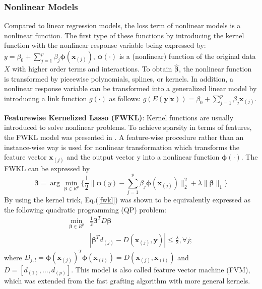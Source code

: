 \documentclass[lang=cn,10pt]{gorgeousnbook}
\numberwithin{equation}{section}%
\numberwithin{figure}{section}%
\begin{document}
\subsubsection{Nonlinear Models}
Compared to linear regression models, the loss term of nonlinear models is a nonlinear function. The first type of these
functions by introducing the kernel function with the nonlinear response variable being expressed by: $y=\beta_0+\sum_{j=1}^p\beta_j\pmb\phi(\textbf{x}_{(j)})$, $\pmb\phi(\cdot)$ is a (nonlinear) function of the original data $X$ with higher order terms and interactions. To obtain $\hat{\boldsymbol{\beta}}$, the nonlinear function is transformed by
piecewise polynomials, splines, or kernels. In addition, a nonlinear response variable can be transformed into a generalized
linear model by introducing a link function $g(\cdot)$ as follows: $g(E(\mathbf{y}|\mathbf{x}))=\beta_{0}+\sum_{j=1}^{p}\beta_{j}\mathbf{x}_{(j)}$.

\textbf{Featurewise Kernelized Lasso (FWKL)}: Kernel functions are usually introduced to solve nonlinear problems.
To achieve sparsity in terms of features, the FWKL model was presented in \cite{ref3}. A feature-wise procedure rather than an instance-wise way is used for nonlinear transformation which transforms the feature vector $\mathbf{x}_{(j)}$ and the output vector y into a nonlinear function $\pmb\phi(\cdot)$. The FWKL can be expressed by 
\begin{equation}
\boldsymbol{\beta}=\operatorname{arg}\operatorname*{min}_{\boldsymbol{\beta}\in R^{p}}\{\frac{1}{2}\|\boldsymbol{\phi}(y)-\sum_{j=1}^{p}\beta_{j}\boldsymbol{\phi}(\boldsymbol{x}_{(j)})\|_{2}^{2}+\lambda\|\boldsymbol{\beta}\|_1\}
\label{fwkl}
\end{equation}
By using the kernel trick, Eq.(\ref{fwkl}) was shown to be equivalently expressed as the following quadratic programming (QP) problem:
\begin{equation}
\begin{aligned}
\operatorname*{min}_{\boldsymbol\beta\in R^{p}}&\frac{1}{2}\boldsymbol\beta^{T}D\boldsymbol\beta \\
&|{\boldsymbol{\beta}}^{T}d_{(j)}-D(\boldsymbol{x}_{(j)},\boldsymbol{y})|\le\frac{\lambda}{2}, \forall j;
\end{aligned}
\end{equation}
where $D_{j,l}=\pmb{\phi}(\pmb{x}_{(j)})^{T}\pmb{\phi}(\pmb{x}_{(l)}){=}D(\pmb{x}_{(j)},{\pmb{x}}_{(l)})$ and $D=[d_{(1)},\ldots,d_{(p)}]$. This model is also called feature vector machine (FVM), which was extended from the fast grafting algorithm with more general kernels.
\end{document}
